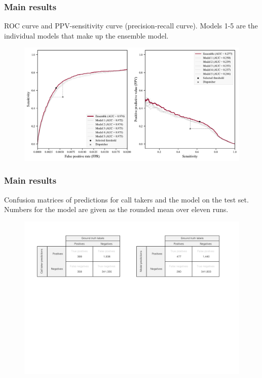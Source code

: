 \begin{frame}
    \frametitle{Main results}
    ROC curve and PPV-sensitivity curve (precision-recall curve). Models 1-5 are the individual models that make up the ensemble model.
    \begin{figure}
        \centering
        \includegraphics[width=0.65\paperwidth]{../graphics/paper_retrospective/figure1.pdf}
    \end{figure}
\end{frame}


\begin{frame}
    \frametitle{Main results}
    Confusion matrices of predictions for call takers and the model on the test set. Numbers for the model are given as the rounded mean over eleven runs.
    \begin{figure}
        \centering
        \includegraphics[width=0.85\paperwidth]{../graphics/paper_retrospective/figure2.pdf}
    \end{figure}

\end{frame}


